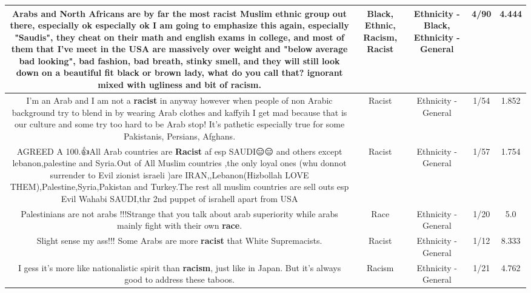 \documentclass[11pt]{article}
\newlength\mylength
\begin{document}
\begin{center}
\begin{longtable}{|C{.65\mylength}|C{.30\mylength}|C{.12\mylength}|C{.12\mylength}|C{.12\mylength}|}
  \small Arabs and North Africans are by far the most \textbf{racist} Muslim \textbf{ethnic} group out there, especially ok especially ok I am going to emphasize this again, especially "Saudis", they cheat on their math and english exams in college, and most of them that I've meet in the USA are massively over weight and "below average bad looking", bad fashion, bad breath, stinky smell, and they will still look down on a beautiful fit \textbf{black} or brown lady, what do you call that? ignorant mixed with ugliness and bit of \textbf{racism}.\normalsize   & Black, Ethnic, Racism, Racist & Ethnicity - Black, Ethnicity - General & 4/90 & 4.444 \\  \hline
  \small I'm an Arab and I am not a \textbf{racist} in anyway however when people of non Arabic background try to blend in by wearing Arab clothes and kaffyih I get mad because that is our culture and some try too hard to be Arab stop! It's pathetic especially true for some Pakistanis, Persians, Afghans.\normalsize   & Racist & Ethnicity - General & 1/54 & 1.852 \\  \hline
  \small AGREED A 100.👍All Arab countries are \textbf{Racist} af esp SAUDI😑😑 and others except lebanon,palestine and Syria.Out of All Muslim countries ,the only loyal ones (whu donnot surrender to Evil zionist israeli )are IRAN,,Lebanon(Hizbollah LOVE THEM),Palestine,Syria,Pakistan and Turkey.The rest all muslim countries are sell outs esp Evil Wahabi SAUDI,thr 2nd puppet of israhell apart from USA\normalsize   & Racist & Ethnicity - General & 1/57 & 1.754 \\  \hline
  \small Palestinians are not arabs !!!Strange that you talk about arab superiority while arabs mainly fight with their own \textbf{race}.\normalsize   & Race & Ethnicity - General & 1/20 & 5.0 \\  \hline
  \small Slight sense my ass!!! Some Arabs are more \textbf{racist} that White Supremacists.\normalsize   & Racist & Ethnicity - General & 1/12 & 8.333 \\  \hline
  \small I gess it's more like nationalistic spirit than \textbf{racism}, just like in Japan. But it's always good to address these taboos.\normalsize   & Racism & Ethnicity - General & 1/21 & 4.762 \\  \hline

\end{longtable}
\end{center}
\end{document}
